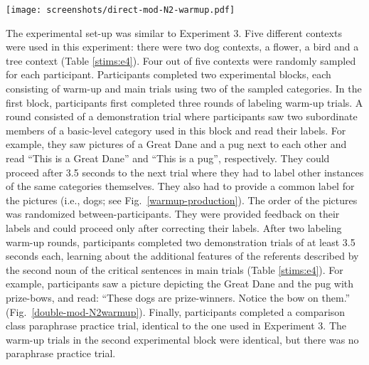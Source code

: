 \begin{figure*}[t]
	\begin{center}
		\texttt{[image: screenshots/direct-mod-N2-warmup.pdf]}
	\end{center}
	\vspace{-2cm}
	\caption{Experiment 4 feature demonstration trial: Participants learn about additional features of the referents used on one critical main trial. For the dog-context participants learn that the pug and the Great Dane are prize-winners, indicated by bows on them.}
	\label{double-mod-N2warmup}
\end{figure*} 
The experimental set-up was similar to Experiment 3. Five different contexts were used in this experiment: there were two dog contexts, a flower, a bird and a tree context (Table \ref{stims:e4}). Four out of five contexts were randomly sampled for each participant.  Participants completed two experimental blocks, each consisting of warm-up and main trials using two of the sampled categories. In the first block, participants first completed three rounds of labeling warm-up trials. A round consisted of a demonstration trial where participants saw two subordinate members of a basic-level category used in this block and read their labels. For example, they saw pictures of a Great Dane and a pug next to each other and read “This is a Great Dane” and “This is a pug”, respectively. They could proceed after 3.5 seconds to the next trial where they had to label other instances of the same categories themselves. They also had to provide a common label for the pictures (i.e., dogs; see Fig.~\ref{warmup-production}). The order of the pictures was randomized between-participants. They were provided feedback on their labels and could proceed only after correcting their labels.  After two labeling warm-up rounds, participants completed two demonstration trials of at least 3.5 seconds each, learning about the additional features of the referents described by the second noun of the critical sentences in main trials (Table \ref{stims:e4}). For example, participants saw a picture depicting the Great Dane and the pug with prize-bows, and read: “These dogs are prize-winners. Notice the bow on them.” (Fig.~\ref{double-mod-N2warmup}). Finally, participants completed a comparison class paraphrase practice trial, identical to the one used in Experiment 3. The warm-up trials in the second experimental block were identical, but there was no paraphrase practice trial.  

